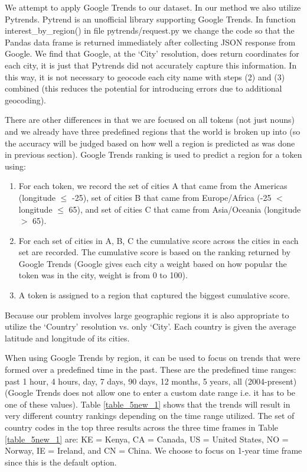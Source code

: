 We attempt to apply Google Trends to our dataset. In our method we also utilize Pytrends. Pytrend is an unofficial library supporting Google Trends. In function interest\_by\_region() in file pytrends/request.py we change the code so that the Pandas data frame is returned immediately after collecting JSON response from Google. We find that Google, at the `City’ resolution, does return coordinates for each city, it is just that Pytrends did not accurately capture this information. In this way, it is not necessary to geocode each city name with steps (2) and (3) combined (this reduces the potential for introducing errors due to additional geocoding).

There are other differences in that we are focused on all tokens (not just nouns) and we already have three predefined regions that the world is broken up into (so the accuracy will be judged based on how well a region is predicted as was done in previous section). Google Trends ranking is used to predict a region for a token using:
\begin{enumerate}
\item  For each token, we record the set of cities A that came from the Americas (longitude $\leq$ -25), set of cities B that came from Europe/Africa (-25 $<$ longitude $\leq$ 65), and set of cities C that came from Asia/Oceania (longitude $>$ 65).
\item  For each set of cities in A, B, C the cumulative score across the cities in each set are recorded. The cumulative score is based on the ranking returned by Google Trends (Google gives each city a weight based on how popular the token was in the city, weight is from 0 to 100).
\item  A token is assigned to a region that captured the biggest cumulative score.
\end{enumerate}

Because our problem involves large geographic regions it is also appropriate to utilize the `Country’ resolution vs. only `City’. Each country is given the average latitude and longitude of its cities.%

When using Google Trends by region, it can be used to focus on trends that were formed over a predefined time in the past. These are the predefined time ranges: past 1 hour, 4 hours, day, 7 days, 90 days, 12 months, 5 years, all (2004-present) (Google Trends does not allow one to enter a custom date range i.e. it has to be one of these values).  Table \ref{table_5new_1} shows that the trends will result in very different country rankings depending on the time range utilized. The set of country codes in the top three results across the three time frames in Table \ref{table_5new_1} are: KE = Kenya, CA = Canada, US = United States, NO = Norway, IE = Ireland, and CN = China. We choose to focus on 1-year time frame since this is the default option.

